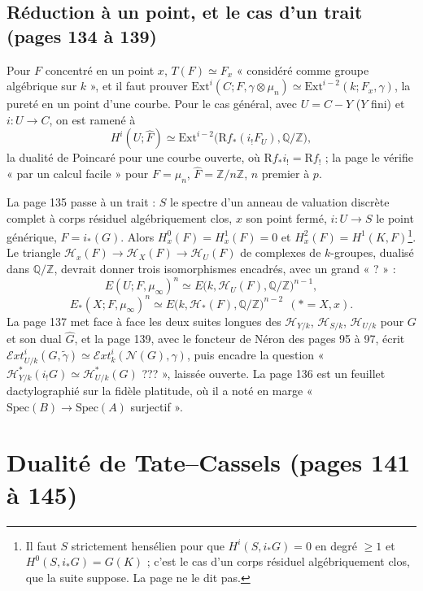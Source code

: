 \documentclass[11pt,a4paper]{article}
\begin{document}
\subsection*{Réduction à un point, et le cas d'un trait (pages 134 à 139)}

Pour $F$ concentré en un point $x$, $T(F) \simeq F_x$ « considéré comme groupe
algébrique sur $k$ », et il faut prouver $\mathrm{Ext}^i(C; F, \gamma \otimes
\mu_n) \simeq \mathrm{Ext}^{i-2}(k; F_x, \gamma)$, la pureté en un point d'une
courbe. Pour le cas général, avec $U = C - Y$ ($Y$ fini) et $i : U \to C$, on est
ramené à
\[
H^i(U; \hat F) \simeq \mathrm{Ext}^{i-2}\bigl(\mathrm{R}f_*(i_!F_U), \mathbb{Q}/\mathbb{Z}\bigr),
\]
la dualité de Poincaré pour une courbe ouverte, où $\mathrm{R}f_* i_! =
\mathrm{R}f_!$ ; la page le vérifie « par un calcul facile » pour $F = \mu_n$,
$\hat F = \mathbb{Z}/n\mathbb{Z}$, $n$ premier à $p$.

La page 135 passe à un trait : $S$ le spectre d'un anneau de valuation discrète
complet à corps résiduel algébriquement clos, $x$ son point fermé, $i : U \to S$ le
point générique, $F = i_*(G)$. Alors $H^0_x(F) = H^1_x(F) = 0$ et $H^2_x(F) = H^1(K,
F)$\footnote{Il faut $S$ strictement hensélien pour que $H^i(S, i_*G) = 0$ en
degré $\geq 1$ et $H^0(S, i_*G) = G(K)$ ; c'est le cas d'un corps résiduel
algébriquement clos, que la suite suppose. La page ne le dit pas.}. Le triangle
$\mathcal{H}_x(F) \to \mathcal{H}_X(F) \to \mathcal{H}_U(F)$ de complexes de
$k$-groupes, dualisé dans $\mathbb{Q}/\mathbb{Z}$, devrait donner trois isomorphismes
encadrés, avec un grand « ? » :
\[
E(U; F, \mu_\infty)^n \simeq E\bigl(k, \mathcal{H}_U(F), \mathbb{Q}/\mathbb{Z}\bigr)^{n-1},
\]
\[
E_{\ast}(X; F, \mu_\infty)^n \simeq E\bigl(k, \mathcal{H}_{\ast}(F), \mathbb{Q}/\mathbb{Z}\bigr)^{n-2}
\ \ (\ast = X, x).
\]
La page 137 met face à face les deux suites longues des $\mathcal{H}_{Y/k}$,
$\mathcal{H}_{S/k}$, $\mathcal{H}_{U/k}$ pour $G$ et son dual $\hat G$, et la page
139, avec le foncteur de Néron des pages 95 à 97, écrit
$\mathcal{E}xt^i_{U/k}(G, \tilde\gamma) \simeq \mathcal{E}xt^i_k(\mathcal{N}(G),
\gamma)$, puis encadre la question « $\mathcal{H}^{*}_{Y/k}(i_!G) \simeq
\mathcal{H}^{*}_{U/k}(G)$ ??? », laissée ouverte. La page 136 est un feuillet
dactylographié sur la fidèle platitude, où il a noté en marge
« $\mathrm{Spec}(B) \to \mathrm{Spec}(A)$ surjectif ».

\section*{Dualité de Tate–Cassels (pages 141 à 145)}
\end{document}

